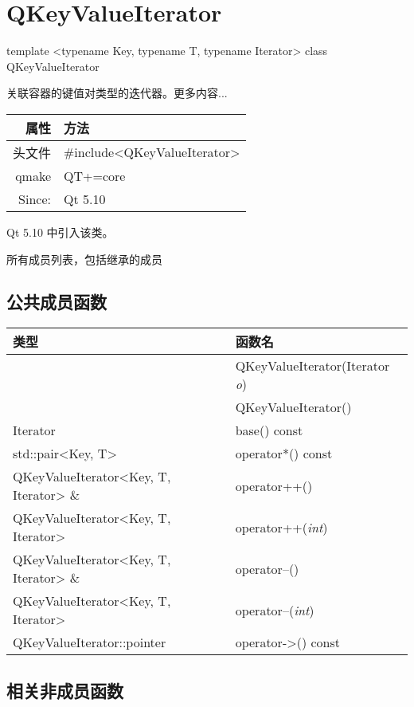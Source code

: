 \chapter{QKeyValueIterator}


template <typename Key, typename T, typename Iterator> class QKeyValueIterator

关联容器的键值对类型的迭代器。更多内容...

\begin{tabular}{|r|l|}
	\hline
	属性 & 方法 \\
	\hline
	头文件 & \#include<QKeyValueIterator>\\      
	\hline
	qmake & QT+=core\\      
	\hline
	Since:&	Qt 5.10 \\ 
	\hline
\end{tabular}

Qt 5.10 中引入该类。

\begin{compactitem}[\arr]
\item 所有成员列表，包括继承的成员
\end{compactitem}

\section{公共成员函数}

\begin{tabular}{|l|l|}
\hline
类型 &	函数名\\
\hline
& QKeyValueIterator(Iterator \emph{o}) \\ 
\hline
& QKeyValueIterator() \\ 
\hline
Iterator	& base() const \\ 
\hline
std::pair<Key, T>	& operator*() const \\ 
\hline
QKeyValueIterator<Key, T, Iterator> \&	& operator++() \\ 
\hline
QKeyValueIterator<Key, T, Iterator>	& operator++(\emph{int}) \\ 
\hline
QKeyValueIterator<Key, T, Iterator> \& &	operator--() \\ 
\hline
QKeyValueIterator<Key, T, Iterator>	 &operator--(\emph{int}) \\ 
\hline
QKeyValueIterator::pointer &	operator->() const \\ 
\hline
\end{tabular}

\section{相关非成员函数}

